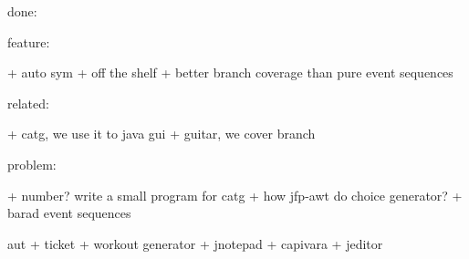 done:

feature:

+ auto sym
+ off the shelf
+ better branch coverage than pure event sequences

related:

+ catg, we use it to java gui
+ guitar, we cover branch

problem:

+ number? write a small program for catg
+ how jfp-awt do choice generator?
+ barad event sequences


aut
+ ticket
+ workout generator
+ jnotepad
+ capivara
+ jeditor
